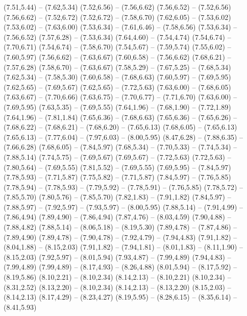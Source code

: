 {  (7.51,5.44) -- (7.62,5.34)
  (7.52,6.56) -- (7.56,6.62)
  (7.56,6.52) -- (7.52,6.56)
  (7.56,6.62) -- (7.52,6.72)
  (7.52,6.72) -- (7.58,6.70)
  (7.62,6.05) -- (7.53,6.02)
  (7.53,6.02) -- (7.63,6.00)
  (7.53,6.34) -- (7.61,6.46) -- (7.58,6.56)
  (7.53,6.34) -- (7.56,6.52)
  (7.57,6.28) -- (7.53,6.34)
  (7.64,4.60) -- (7.54,4.74)
  (7.54,6.74) -- (7.70,6.71)
  (7.54,6.74) -- (7.58,6.70)
  (7.54,5.67) -- (7.59,5.74)
  (7.55,6.02) -- (7.60,5.97)
  (7.56,6.62) -- (7.63,6.67)
  (7.60,6.58) -- (7.56,6.62)
  (7.68,6.21) -- (7.57,6.28)
  (7.58,6.70) -- (7.63,6.67)
  (7.58,5.29) -- (7.67,5.25) -- (7.68,5.34)
  (7.62,5.34) -- (7.58,5.30)
  (7.60,6.58) -- (7.68,6.63)
  (7.60,5.97) -- (7.69,5.95)
  (7.62,5.65) -- (7.69,5.67)
  (7.62,5.65) -- (7.72,5.63)
  (7.63,6.00) -- (7.68,6.05)
  (7.63,6.67) -- (7.70,6.66)
  (7.63,6.75) -- (7.70,6.77) -- (7.71,6.70)
  (7.63,6.00) -- (7.69,5.95)
  (7.63,5.35) -- (7.69,5.55)
  (7.64,1.96) -- (7.68,1.90) -- (7.72,1.89)
  (7.64,1.96) -- (7.81,1.84)
  (7.65,6.36) -- (7.68,6.63)
  (7.65,6.36) -- (7.65,6.26) -- (7.68,6.22) -- (7.68,6.21) -- (7.68,6.20) -- (7.65,6.13)
  (7.68,6.05) -- (7.65,6.13)
  (7.65,6.13) -- (7.77,6.04) -- (7.97,6.03) -- (8.00,5.95)
  (8.47,6.28) -- (7.88,6.35) -- (7.66,6.28)
  (7.68,6.05) -- (7.84,5.97)
  (7.68,5.34) -- (7.70,5.33) -- (7.74,5.34) -- (7.88,5.14)
  (7.74,5.75) -- (7.69,5.67)
  (7.69,5.67) -- (7.72,5.63)
  (7.72,5.63) -- (7.80,5.64) -- (7.69,5.55)
  (7.81,5.52) -- (7.69,5.55)
  (7.69,5.95) -- (7.84,5.97)
  (7.78,5.93) -- (7.71,5.87)
  (7.75,5.82) -- (7.71,5.87)
  (7.84,5.97) -- (7.76,5.85)
  (7.78,5.94) -- (7.78,5.93) -- (7.79,5.92) -- (7.78,5.91) -- (7.76,5.85)
  (7.78,5.72) -- (7.85,5.70)
  (7.80,5.76) -- (7.85,5.70)
  (7.82,1.83) -- (7.91,1.82)
  (7.84,5.97) -- (7.88,5.97) -- (7.92,5.97) -- (7.93,5.97) -- (8.00,5.95)
  (7.88,5.14) -- (7.91,4.99) -- (7.86,4.94)
  (7.89,4.90) -- (7.86,4.94)
  (7.87,4.76) -- (8.03,4.59)
  (7.90,4.88) -- (7.88,4.82)
  (7.88,5.14) -- (8.06,5.18) -- (8.19,5.30)
  (7.89,4.78) -- (7.87,4.86) -- (7.89,4.90)
  (7.89,4.78) -- (7.90,4.78) -- (7.92,4.79) -- (7.94,4.83)
  (7.91,1.82) -- (8.04,1.88) -- (8.15,2.03)
  (7.91,1.82) -- (7.94,1.81) -- (8.01,1.83) -- (8.11,1.90) -- (8.15,2.03)
  (7.92,5.97) -- (8.01,5.94)
  (7.93,4.87) -- (7.99,4.89)
  (7.94,4.83) -- (7.99,4.89)
  (7.99,4.89) -- (8.17,4.93) -- (8.26,4.88)
  (8.01,5.94) -- (8.17,5.92) -- (8.19,5.86)
  (8.10,2.21) -- (8.10,2.34)
  (8.14,2.13) -- (8.10,2.21)
  (8.10,2.34) -- (8.31,2.52)
  (8.13,2.20) -- (8.10,2.34)
  (8.14,2.13) -- (8.13,2.20)
  (8.15,2.03) -- (8.14,2.13)
  (8.17,4.29) -- (8.23,4.27)
  (8.19,5.95) -- (8.28,6.15) -- (8.35,6.14) -- (8.41,5.93)
}
